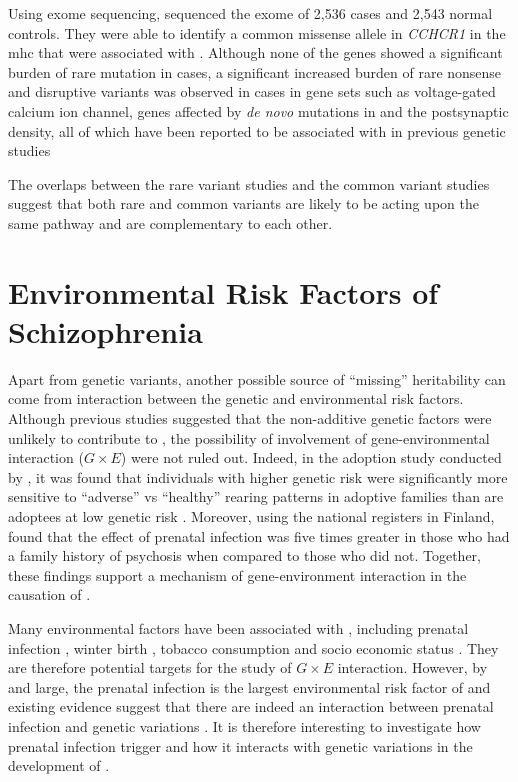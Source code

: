 \documentclass[12pt]{scrbook}
\newcommand*{\glng}{\glsentrylong}
\begin{document}
	Using exome sequencing, \citet{Purcell2014} sequenced the exome of 2,536 \glng{scz} cases and 2,543 normal controls. 
	They were able to identify a common missense allele in \textit{CCHCR1} in the \gls{mhc} that were associated with \glng{scz}.
	Although none of the genes showed a significant burden of rare mutation in cases, a significant increased burden of rare nonsense and disruptive variants was observed in cases in gene sets such as voltage-gated calcium ion channel, genes affected by \textit{de novo} mutations in \glng{scz} \citep{Fromer2014} and the postsynaptic density, all of which have been reported to be associated with \glng{scz} in previous genetic studies \citep{Ripke2014}
	
	The overlaps between the rare variant studies and the common variant studies suggest that both rare and common variants are likely to be acting upon the same pathway and are complementary to each other.
	
	\section{Environmental Risk Factors of Schizophrenia}
	Apart from genetic variants, another possible source of ``missing'' heritability can come from interaction between the genetic and environmental risk factors.
	Although previous studies \citep{Gottesman01071967} suggested that the non-additive genetic factors were unlikely to contribute to \glng{scz}, the possibility of involvement of gene-environmental interaction ($G\times E$) were not ruled out.
	Indeed, in the adoption study conducted by \citet{Tienari2004}, it was found that individuals with higher genetic risk were significantly more sensitive to ``adverse'' vs ``healthy'' rearing patterns in adoptive families than are adoptees at low genetic risk \citep{Tienari2004}.
	Moreover, using the national registers in Finland, \citet{Clarke2009} found that the effect of prenatal infection was five times greater in those who had a family history of psychosis when compared to those who did not. 
	Together, these findings support a mechanism of gene-environment interaction in the causation of \glng{scz}.
	
	Many environmental factors have been associated with \glng{scz}, including prenatal infection \citep{Brown2010}, winter birth \citep{OCallaghan1991}, tobacco consumption \citep{Kelly1999} and socio economic status \citep{McGrath2008a}.
	They are therefore potential targets for the study of $G\times E$ interaction.
	However, by and large, the prenatal infection is the largest environmental risk factor of \glng{scz} and existing evidence suggest that there are indeed an interaction between prenatal infection and genetic variations \citep{Clarke2009}.
	It is therefore interesting to investigate how prenatal infection trigger \glng{scz} and how it interacts with genetic variations in the development of \glng{scz}.	
	
\end{document}
